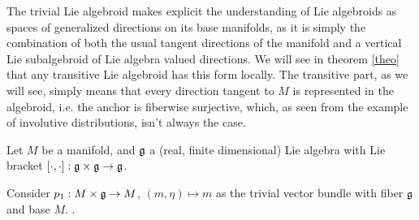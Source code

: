 The trivial Lie algebroid makes explicit the understanding of Lie algebroids as spaces of generalized directions on its base manifolds, as it is simply the combination of both the usual tangent directions of the manifold and a vertical Lie subalgebroid of Lie algebra valued directions. We will see in theorem \ref{theo} that any transitive Lie algebroid has this form locally. The transitive part, as we will see, simply means that every direction tangent to $M$ is represented in the algebroid, i.e. the anchor is fiberwise surjective, which, as seen from the example of involutive distributions, isn't always the case.

Let $M$ be a manifold, and $\mathfrak{g}$ a (real, finite dimensional) Lie algebra with Lie bracket $[\cdot , \cdot]: \mathfrak{g} \times \mathfrak{g} \to \mathfrak{g}$.

Consider $p_1: M \times \mathfrak{g} \to M$, $(m, \eta) \mapsto m$ as the trivial vector bundle with fiber $\mathfrak{g}$ and base $M$. . %

